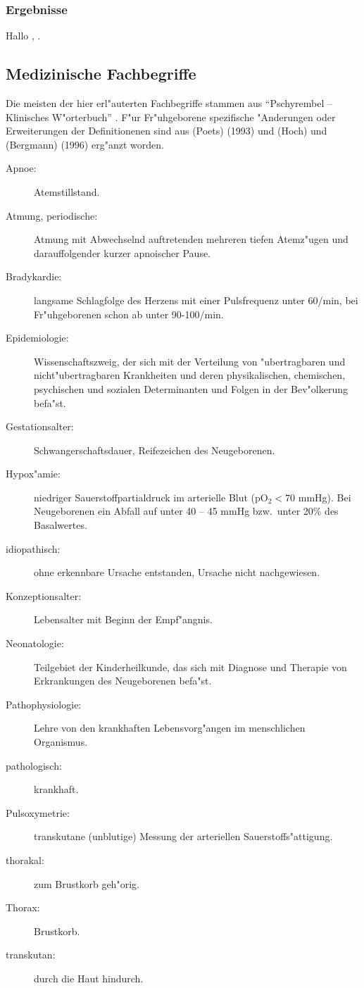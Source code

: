 \subsection{Ergebnisse}
Hallo \cite{Poets93}, \cite{Hoch96}. 


\begin{appendix}
\chapter{Medizinische Fachbegriffe} 
Die meisten der hier erl"auterten Fachbegriffe stammen aus ``Pschyrembel -- Klinisches
W"orterbuch'' \cite{Pschyrembel}. F"ur Fr"uhgeborene spezifische "Anderungen oder
Erweiterungen der Definitionenen sind aus \autor(Poets) (1993) \cite{Poets93} und
\autor(Hoch) und \autor(Bergmann) (1996) \cite{Hoch96} erg"anzt worden.

\begin{description}
\item[Apnoe:] Atemstillstand.
\item[Atmung, periodische:] Atmung mit Abwechselnd auftretenden mehreren tiefen Atemz"ugen
  und darauffolgender kurzer apnoischer Pause.
\item[Bradykardie:] langsame Schlagfolge des Herzens mit einer Pulsfrequenz unter 60/min,
  bei Fr"uhgeborenen schon ab unter 90-100/min.
\item[Epidemiologie:] Wissenschaftszweig, der sich mit der Verteilung von "ubertragbaren
  und nicht"ubertragbaren Krankheiten und deren physikalischen, chemischen, psychischen
  und sozialen Determinanten und Folgen in der Bev"olkerung befa"st.
\item[Gestationsalter:] Schwangerschaftsdauer, Reifezeichen des Neugeborenen.
\item[Hypox"amie:] niedriger Sauerstoffpartialdruck im arterielle Blut ($\mathrm{pO_2}<70$
  mmHg). Bei Neugeborenen ein Abfall auf unter 40 -- 45 mmHg bzw.\  unter 20\% des Basalwertes. 
\item[idiopathisch:] ohne erkennbare Ursache entstanden, Ursache nicht nachgewiesen.
\item[Konzeptionsalter:] Lebensalter mit Beginn der Empf"angnis.
\item[Neonatologie:] Teilgebiet der Kinderheilkunde, das sich mit Diagnose und Therapie von
  Erkrankungen des Neugeborenen befa"st.
\item[Pathophysiologie:] Lehre von den krankhaften Lebensvorg"angen im menschlichen
  Organismus.
\item[pathologisch:] krankhaft.
\item[Pulsoxymetrie:] transkutane (unblutige) Messung der arteriellen Sauerstoffs"attigung.
\item[thorakal:] zum Brustkorb geh"orig.
\item[Thorax:] Brustkorb.
\item[transkutan:] durch die Haut hindurch.
\end{description}
   
\end{appendix}

   
      
